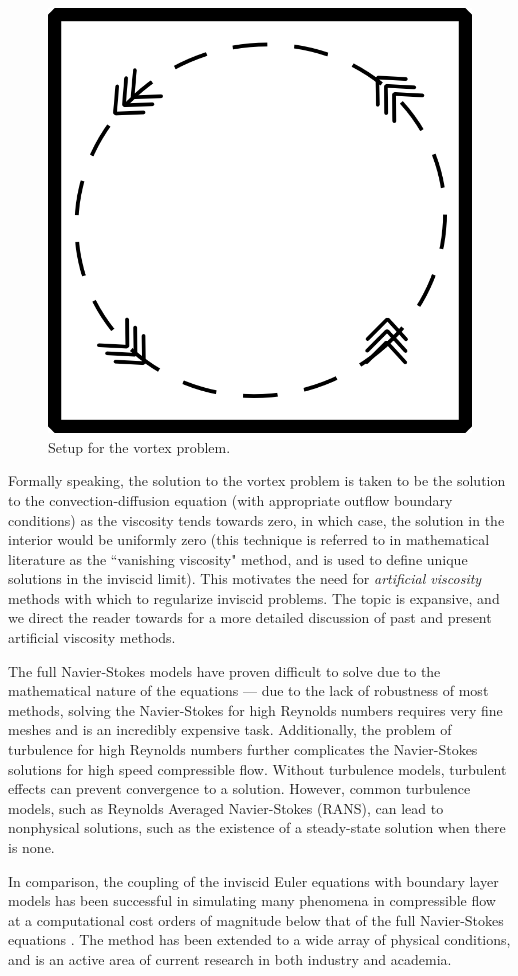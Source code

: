 \begin{figure}[!h]
\centering
\includegraphics[scale = .3]{figs/convCirc.png}
\caption{Setup for the vortex problem.}
\label{fig:convCirc}
\end{figure}
Formally speaking, the solution to the vortex problem is taken to be the solution to the convection-diffusion equation (with appropriate outflow boundary conditions) as the viscosity tends towards zero, in which case, the solution in the interior would be uniformly zero (this technique is referred to in mathematical literature as the ``vanishing viscosity" method, and is used to define unique solutions in the inviscid limit).  This motivates the need for \emph{artificial viscosity} methods with which to regularize inviscid problems.  The topic is expansive, and we direct the reader towards \cite{Barter} for a more detailed discussion of past and present artificial viscosity methods. 

The full Navier-Stokes models have proven difficult to solve due to the mathematical nature of the equations --- due to the lack of robustness of most methods, solving the Navier-Stokes for high Reynolds numbers requires very fine meshes and is an incredibly expensive task.  Additionally, the problem of turbulence for high Reynolds numbers further complicates the Navier-Stokes solutions for high speed compressible flow.  Without turbulence models, turbulent effects can prevent convergence to a solution.  However, common turbulence models, such as Reynolds Averaged Navier-Stokes (RANS), can lead to nonphysical solutions, such as the existence of a steady-state solution when there is none.  

In comparison, the coupling of the inviscid Euler equations with boundary layer models has been successful in simulating many phenomena in compressible flow at a computational cost orders of magnitude below that of the full Navier-Stokes equations \cite{BoeingDrela}.  The method has been extended to a wide array of physical conditions, and is an active area of current research in both industry and academia.  
